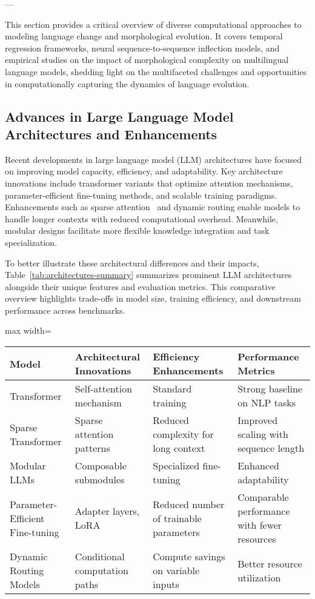 \documentclass[sigconf]{acmart}
\begin{document}
---

This section provides a critical overview of diverse computational approaches to modeling language change and morphological evolution. It covers temporal regression frameworks, neural sequence-to-sequence inflection models, and empirical studies on the impact of morphological complexity on multilingual language models, shedding light on the multifaceted challenges and opportunities in computationally capturing the dynamics of language evolution.

\subsection{Advances in Large Language Model Architectures and Enhancements}

Recent developments in large language model (LLM) architectures have focused on improving model capacity, efficiency, and adaptability. Key architecture innovations include transformer variants that optimize attention mechanisms, parameter-efficient fine-tuning methods, and scalable training paradigms. Enhancements such as sparse attention~\cite{} and dynamic routing enable models to handle longer contexts with reduced computational overhead. Meanwhile, modular designs facilitate more flexible knowledge integration and task specialization.

To better illustrate these architectural differences and their impacts, Table~\ref{tab:architectures-summary} summarizes prominent LLM architectures alongside their unique features and evaluation metrics. This comparative overview highlights trade-offs in model size, training efficiency, and downstream performance across benchmarks.

\begin{table*}[htbp]
\centering
\caption{Summary of Key Large Language Model Architectures and Their Evaluation Metrics}
\label{tab:architectures-summary}
\begin{adjustbox}{max width=\textwidth}
\begin{tabular}{@{}llll@{}}
\toprule
Model & Architectural Innovations & Efficiency Enhancements & Performance Metrics \\ \midrule
Transformer & Self-attention mechanism & Standard training & Strong baseline on NLP tasks \\
Sparse Transformer & Sparse attention patterns & Reduced complexity for long context & Improved scaling with sequence length \\
Modular LLMs & Composable submodules & Specialized fine-tuning & Enhanced adaptability \\
Parameter-Efficient Fine-tuning & Adapter layers, LoRA & Reduced number of trainable parameters & Comparable performance with fewer resources \\
Dynamic Routing Models & Conditional computation paths & Compute savings on variable inputs & Better resource utilization \\ \bottomrule
\end{tabular}
\end{adjustbox}
\end{table*}
\end{document}
